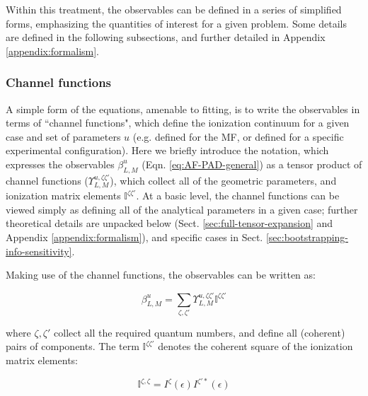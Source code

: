 \documentclass[10pt]{article}
\begin{document}
Within this treatment, the observables can be defined in a series of simplified forms, emphasizing the quantities of interest for a given problem. Some details are defined in the following subsections, and further detailed in Appendix \ref{appendix:formalism}.


\subsubsection{Channel functions\label{sec:channel-funcs}}

A simple form of the equations, amenable to fitting, is to write the observables in terms of ``channel functions", which define the ionization continuum for a given case and set of parameters $u$ (e.g. defined for the MF, or defined for a specific experimental configuration). Here we briefly introduce the notation, which expresses the observables $\beta_{L,M}^{u}$ (Eqn. \ref{eq:AF-PAD-general}) as a tensor product of channel functions ($\varUpsilon_{L,M}^{u,\zeta\zeta'}$), which collect all of the geometric parameters, and ionization matrix elements $\mathbb{I}^{\zeta\zeta'}$. At a basic level, the channel functions can be viewed simply as defining all of the analytical parameters in a given case; further theoretical details are unpacked below (Sect. \ref{sec:full-tensor-expansion} and Appendix \ref{appendix:formalism}), and specific cases in Sect. \ref{sec:bootstrapping-info-sensitivity}.

Making use of the channel functions, the observables can be written as:

\begin{equation}
\beta_{L,M}^{u}=\sum_{\zeta,\zeta'}\varUpsilon_{L,M}^{u,\zeta\zeta'}\mathbb{I}^{\zeta\zeta'}\label{eqn:channel-fns}
\end{equation}


where $\zeta,\zeta'$ collect all the required quantum numbers, and define all (coherent) pairs of components. The term $\mathbb{I}^{\zeta\zeta'}$ denotes the coherent square of the ionization matrix elements:

\begin{equation}
\mathbb{I}^{\zeta,\zeta}=I^{\zeta}(\epsilon)I^{\zeta'*}(\epsilon)
\label{eqn:I-zeta}
\end{equation}
\end{document}
